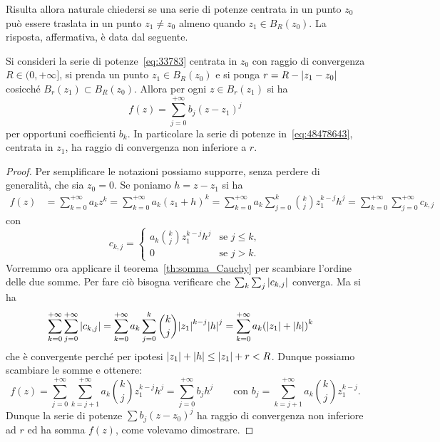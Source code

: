 Risulta allora naturale chiedersi se una serie di potenze centrata in un punto $z_0$
può essere traslata in un punto $z_1\neq z_0$ almeno quando $z_1 \in B_R(z_0)$.
La risposta, affermativa, è data dal seguente.

\begin{theorem}
\label{th:488456367}
Si consideri la serie di potenze~\eqref{eq:33783} centrata in $z_0$
con raggio di convergenza
$R\in (0,+\infty]$, si prenda un punto $z_1 \in B_R(z_0)$
e si ponga $r=R-{\left|z_1-z_0\right|}$ cosicché $B_r(z_1)\subset B_R(z_0)$.
Allora
per ogni $z\in B_r(z_1)$ si ha
\begin{equation}\label{eq:48478643}
  f(z) = \sum_{j=0}^{+\infty} b_j (z - z_1)^j
\end{equation}
per opportuni coefficienti $b_k$. In particolare la serie
di potenze in~\eqref{eq:48478643}, centrata in $z_1$,
ha raggio di convergenza non inferiore a $r$.
\end{theorem}
%
\begin{proof}
Per semplificare le notazioni possiamo supporre, senza perdere di generalità,
che sia $z_0=0$. Se poniamo $h=z-z_1$ si ha
\begin{align*}
f(z) 
&= \sum_{k=0}^{+\infty} a_k z^k 
= \sum_{k=0}^{+\infty} a_k (z_1+h)^k
= \sum_{k=0}^{+\infty} a_k \sum_{j=0}^k {k \choose j}z_1^{k-j}h^j
= \sum_{k=0}^{+\infty} \sum_{j=0}^{+\infty} c_{k,j}
\end{align*}
con 
\[
  c_{k,j} = \begin{cases}
    a_k {k \choose j} z_1^{k-j} h^j & \text{se $j\le k$},\\
    0 & \text{se $j>k$}.
  \end{cases}
\]
Vorremmo ora applicare il teorema~\ref{th:somma_Cauchy}
per scambiare l'ordine delle due somme.
Per fare ciò bisogna verificare che 
$\sum_k \sum_j {\left|c_{k,j}\right|}$ converga.
Ma si ha 
\begin{align*}
  \sum_{k=0}^{+\infty}\sum_{j=0}^{+\infty}{\left|c_{k,j}\right|}
  &= \sum_{k=0}^{+\infty} a_k \sum_{j=0}^k {k \choose j}{\left|z_1\right|}^{k-j}{\left|h\right|}^j 
  = \sum_{k=0}^{+\infty} a_k {\left( {\left|z_1\right|}+{\left|h\right|} \right)}^k
\end{align*}
che è convergente perché per ipotesi ${\left|z_1\right|}+{\left|h\right|} \le {\left|z_1\right|} + r < R$. 
Dunque possiamo scambiare le somme e ottenere:
\[
  f(z) = \sum_{j=0}^{+\infty} \sum_{k=j+1}^{+\infty} a_k {k\choose j} z_1^{k-j} h^j
    = \sum_{j=0}^{+\infty} b_j h^j
  \qquad\text{con }
b_j = \sum_{k=j+1}^{+\infty}
 a_k {k\choose j}z_1^{k-j}.
\]
Dunque la serie di potenze $\sum b_j (z-z_0)^j$ 
ha raggio di convergenza non inferiore ad $r$ 
ed ha somma $f(z)$, come volevamo dimostrare.
\end{proof}

